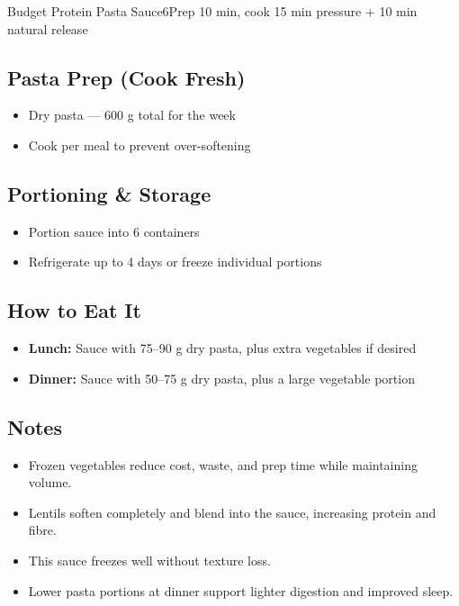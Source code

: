 \begin{recipebox}{Budget Protein Pasta Sauce}{6}{Prep 10 min, cook 15 min pressure + 10 min natural release}
\subsection*{Pasta Prep (Cook Fresh)}
\begin{itemize}
    \item Dry pasta — 600 g total for the week
    \item Cook per meal to prevent over-softening
\end{itemize}

\subsection*{Portioning \& Storage}
\begin{itemize}
    \item Portion sauce into 6 containers
    \item Refrigerate up to 4 days or freeze individual portions
\end{itemize}

\subsection*{How to Eat It}
\begin{itemize}
    \item \textbf{Lunch:} Sauce with 75--90 g dry pasta, plus extra vegetables if desired
    \item \textbf{Dinner:} Sauce with 50--75 g dry pasta, plus a large vegetable portion
\end{itemize}

\subsection*{Notes}
\begin{itemize}
    \item Frozen vegetables reduce cost, waste, and prep time while maintaining volume.
    \item Lentils soften completely and blend into the sauce, increasing protein and fibre.
    \item This sauce freezes well without texture loss.
    \item Lower pasta portions at dinner support lighter digestion and improved sleep.
\end{itemize}
\end{recipebox}
